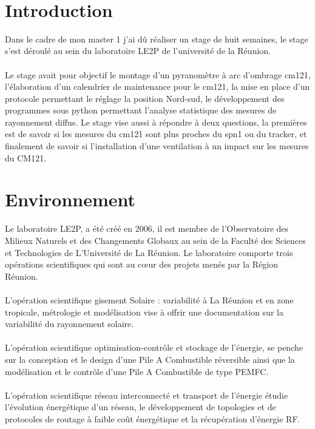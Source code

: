 \documentclass[12pt,a4paper]{article}
\begin{document}
 
~


\newpage







\thispagestyle{empty}
\renewcommand{\contentsname}{Sommaire}
\tableofcontents
\newpage

\newpage


\begin{flushleft}


\sf
\section*{Introduction}
%
\setcounter{page}{3}

Dans le cadre de mon master 1 j'ai dû réaliser un stage de huit semaines, le stage s'est déroulé au sein du laboratoire LE2P de l'université de la Réunion.\\
~\\
Le stage avait pour objectif le montage d'un pyranomètre à arc d'ombrage cm121, l'élaboration d'un calendrier de maintenance pour le cm121, la mise en place d'un protocole permettant le réglage la position Nord-sud, le développement des programmes sous python permettant l'analyse statistique des mesures de rayonnement diffus. Le stage vise aussi à répondre à deux questions, la premières est de savoir si les mesures du cm121 sont plus proches du spn1 ou du tracker, et finalement de savoir si l'installation d'une ventilation à un impact sur les mesures du CM121.
 

\section{Environnement}



Le laboratoire LE2P, a été créé en 2006,  il est membre de l’Observatoire des Milieux Naturels et des Changements Globaux au sein de la Faculté des Sciences et Technologies de L’Université de La Réunion. Le laboratoire comporte trois opérations scientifiques qui sont au cœur des projets menés par la Région Réunion.\\
~\\
L'opération scientifique gisement Solaire : variabilité à La Réunion et en zone tropicale, métrologie et modélisation  vise à offrir une documentation sur la variabilité du rayonnement solaire.\\
~\\
L'opération scientifique optimisation-contrôle et stockage de l'énergie, se penche sur la conception et le design d’une Pile A Combustible réversible ainsi que la modélisation et le contrôle d’une Pile A Combustible de type PEMFC.\\ 
~\\
L'opération scientifique réseau interconnecté et transport de l'énergie étudie l’évolution énergétique d'un réseau, le développement de topologies et de protocoles de routage à faible coût énergétique et la récupération d’énergie RF.




\end{flushleft}
\end{document}
